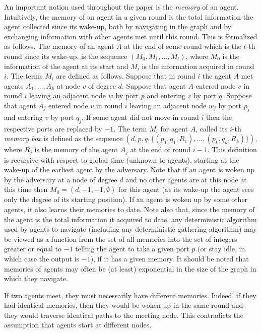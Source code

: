 \documentclass[11pt]{article}
\begin{document}
 An important notion used throughout the paper is the {\em memory} of an agent. 
 Intuitively, the memory of an agent in a given round is the total information the agent collected since its wake-up,
 both by navigating in the graph and by exchanging information with other agents met until this round. This is formalized as follows. The memory of an agent $A$ at
 the end of some round which is  the $t$-th round since its wake-up, is the sequence $(M_0,M_1,\dots ,M_t)$, where $M_0$ is the information of the agent at its start
 and $M_i$ is the information acquired in round $i$. The terms $M_i$ are defined as follows. Suppose that in round $i$ the agent $A$ met agents $A_1,\dots ,A_k$ at node $v$ of degree $d$. Suppose that agent $A$ entered node $v$ in round $i$ leaving an adjacent node $w$ by port $p$ and entering $v$ by port $q$. 
 Suppose that agent $A_j$ entered node $v$ in round $i$ leaving an adjacent node $w_j$ by port $p_j$ and entering $v$ by port $q_j$. If some agent did not move in
 round $i$ then the respective ports are replaced by $-1$. The term $M_i$ for agent $A$, called its $i$-th {\em memory box} is defined as the sequence
 $(d,p,q,\{(p_1,q_1,R_1),\dots, (p_k,q_k,R_k)\})$, where $R_j$ is the memory of the agent $A_j$ at the end of round $i-1$. This definition is recursive with respect to 
  global time (unknown to agents), starting at the wake-up of the earliest agent by the adversary. Note that if an agent is woken up by the adversary 
  at a node of degree $d$ and no other agents are at this node at this time then {$M_0=(d,-1,-1,\emptyset)$} for this agent (at its wake-up the agent sees only the degree of its
  starting position). If an agent is woken up by some other agents, it also learns their memories to date. Note also that, since the memory of the agent is the total  
  information it acquired to date, any deterministic algorithm used by agents to navigate (including any deterministic gathering algorithm) may be viewed as a function
  from the set of all memories into  the set of integers greater or equal to $-1$ telling the agent to take a given port $p$ 
  (or stay idle, in which case the output is $-1$), if it has a given memory. It should be noted that memories of agents may often be (at least) exponential in the size of the graph in which they navigate.
  
  If two agents meet, they must necessarily have different memories. Indeed, if they had identical memories, then they would be woken up in the same round
  and they would traverse identical paths to the meeting node. This contradicts the assumption that agents start at different nodes.
\end{document}

